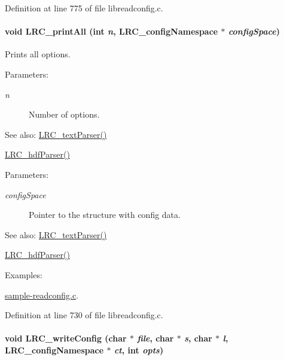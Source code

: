 Definition at line 775 of file libreadconfig.c.\hypertarget{group___l_r_c__wrappers_g434aa10adcbb1572b06ed29b01187716}{
\paragraph[{LRC\_\-printAll}]{\setlength{\rightskip}{0pt plus 5cm}void LRC\_\-printAll (int {\em n}, \/  {\bf LRC\_\-configNamespace} $\ast$ {\em configSpace})}\hfill}
\label{group___l_r_c__wrappers_g434aa10adcbb1572b06ed29b01187716}


Prints all options. 

\begin{Desc}
\item[Parameters:]
\begin{description}
\item[{\em n}]Number of options. \end{description}
\end{Desc}
\begin{Desc}
\item[See also:]\hyperlink{group___l_r_c__parser_g4b1c98d54591fd4d05cc1caee09cbd35}{LRC\_\-textParser()} 

\hyperlink{group___l_r_c__parser_g3cbf6e172a98da00ec8fd0b301b4b8f9}{LRC\_\-hdfParser()}\end{Desc}
\begin{Desc}
\item[Parameters:]
\begin{description}
\item[{\em configSpace}]Pointer to the structure with config data. \end{description}
\end{Desc}
\begin{Desc}
\item[See also:]\hyperlink{group___l_r_c__parser_g4b1c98d54591fd4d05cc1caee09cbd35}{LRC\_\-textParser()} 

\hyperlink{group___l_r_c__parser_g3cbf6e172a98da00ec8fd0b301b4b8f9}{LRC\_\-hdfParser()} \end{Desc}
\begin{Desc}
\item[Examples: ]\par
\hyperlink{sample-readconfig_8c-example}{sample-readconfig.c}.\end{Desc}


Definition at line 730 of file libreadconfig.c.\hypertarget{group___l_r_c__wrappers_g51e21668c4d2e0f397b7d20ac8b9cc50}{
\paragraph[{LRC\_\-writeConfig}]{\setlength{\rightskip}{0pt plus 5cm}void LRC\_\-writeConfig (char $\ast$ {\em file}, \/  char $\ast$ {\em s}, \/  char $\ast$ {\em l}, \/  {\bf LRC\_\-configNamespace} $\ast$ {\em ct}, \/  int {\em opts})}\hfill}
\label{group___l_r_c__wrappers_g51e21668c4d2e0f397b7d20ac8b9cc50}


